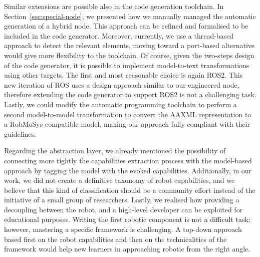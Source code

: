 Similar extensions are possible also in the code generation toolchain. In Section~\ref{sec:special-node}, we presented how we manually managed the automatic generation of a hybrid node. This approach can be refined and formalised to be included in the code generator. Moreover, currently, we use a thread-based approach to detect the relevant elements, moving toward a port-based alternative would give more flexibility to the toolchain. Of course, given the two-steps design of the code generator, it is possible to implement model-to-text transformations using other targets. The first and most reasonable choice is again ROS2. This new iteration of ROS uses a design approach similar to our engineered node, therefore extending the code generator to support ROS2 is not a challenging task. Lastly, we could modify the automatic programming toolchain to perform a second model-to-model transformation to convert the AAXML representation to a RobMoSys compatible model, making our approach fully compliant with their guidelines.

Regarding the abstraction layer, we already mentioned the possibility of connecting more tightly the capabilities extraction process with the model-based approach by tagging the model with the evoked capabilities. Additionally, in our work, we did not create a definitive taxonomy of robot capabilities, and we believe that this kind of classification should be a community effort instead of the initiative of a small group of researchers. Lastly, we realised how providing a decoupling between the robot, and a high-level developer can be exploited for educational purposes. Writing the first robotic component is not a difficult task; however, mastering a specific framework is challenging. A top-down approach based first on the robot capabilities and then on the technicalities of the framework would help new learners in approaching robotic from the right angle. 


